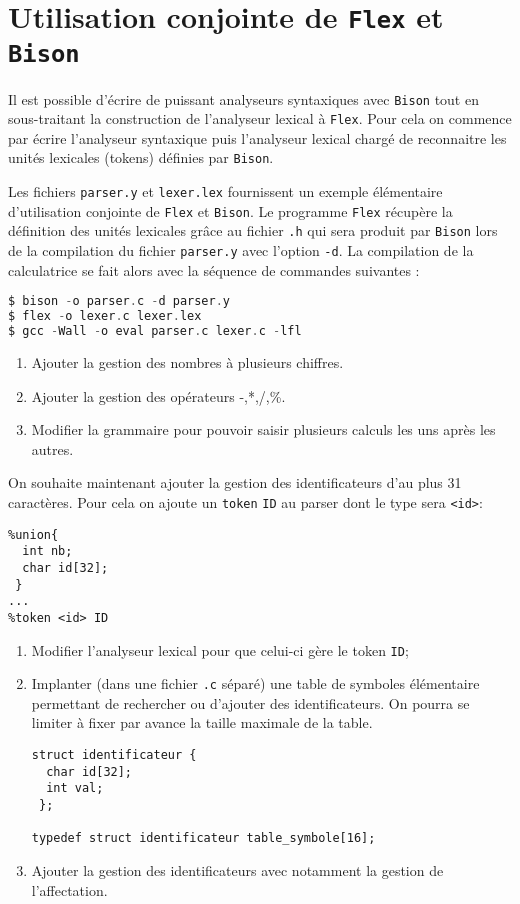 \documentclass[a4paper,10pt, oneside]{article}
\begin{document}
\section{Utilisation conjointe de \texttt{Flex} et \texttt{Bison}}

Il est possible d'écrire de puissant analyseurs syntaxiques avec
\texttt{Bison} tout en sous-traitant la construction de l'analyseur
lexical à \texttt{Flex}. Pour cela on commence par écrire l'analyseur
syntaxique puis l'analyseur lexical chargé de reconnaitre les unités
lexicales (tokens) définies par \texttt{Bison}.

Les fichiers \texttt{parser.y} et \texttt{lexer.lex} fournissent un
exemple élémentaire d'utilisation conjointe de \texttt{Flex} et
\texttt{Bison}. Le programme \texttt{Flex} récupère la définition des
unités lexicales grâce au fichier \texttt{.h} qui sera produit par
\texttt{Bison} lors de la compilation du fichier \texttt{parser.y}
avec l'option \texttt{-d}. La compilation de la calculatrice se fait
alors avec la séquence de commandes suivantes :

\begin{lstlisting}[language=C]
$ bison -o parser.c -d parser.y
$ flex -o lexer.c lexer.lex
$ gcc -Wall -o eval parser.c lexer.c -lfl
\end{lstlisting}



\begin{enumerate}
\item Ajouter la gestion des nombres à plusieurs chiffres.
\item Ajouter la gestion des opérateurs -,*,/,\%.
\item Modifier la grammaire pour pouvoir saisir plusieurs calculs les
  uns après les autres.
\end{enumerate}

On souhaite maintenant ajouter la gestion des identificateurs d'au
plus 31 caractères. Pour cela on ajoute un \texttt{token} \texttt{ID}
au parser dont le type sera \texttt{<id>}:

\begin{lstlisting}
%union{
  int nb;
  char id[32];
 }
...  
%token <id> ID
\end{lstlisting}

\begin{enumerate}
\item Modifier l'analyseur lexical pour que celui-ci gère le token
  \texttt{ID};
\item Implanter (dans une fichier \texttt{.c} séparé) une table de
  symboles élémentaire permettant de rechercher ou d'ajouter des
  identificateurs. On pourra se limiter à fixer par avance la taille
  maximale de la table.

\begin{lstlisting}
struct identificateur {
  char id[32];
  int val;
 };

typedef struct identificateur table_symbole[16]; 
\end{lstlisting}

\item Ajouter la gestion des identificateurs avec notamment la gestion
  de l'affectation.
\end{enumerate}
\end{document}
